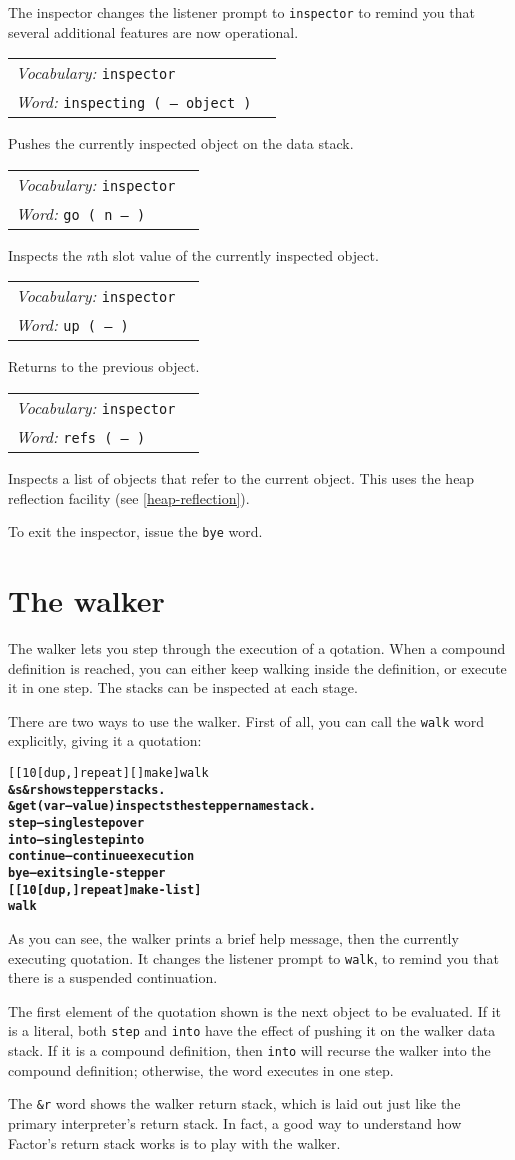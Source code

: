 \documentclass{book}
\newcommand{\vocabulary}[1]{\emph{Vocabulary:} \texttt{#1}&\\}
\newcommand{\ordinaryword}[2]{\index{\texttt{#1}}\emph{Word:} \texttt{#2}&\\}
\newcommand{\wordtable}[1]{


\begin{tabularx}{12cm}{lX}
\hline
#1
\hline
\end{tabularx}

}
\begin{document}
The inspector changes the listener prompt to \verb|inspector| to remind you that several additional features are now operational.
\wordtable{
\vocabulary{inspector}
\ordinaryword{inspecting}{inspecting ( -- object )}
}
Pushes the currently inspected object on the data stack.
\wordtable{
\vocabulary{inspector}
\ordinaryword{go}{go ( n -- )}
}
Inspects the $n$th slot value of the currently inspected object.
\wordtable{
\vocabulary{inspector}
\ordinaryword{up}{up ( -- )}
}
Returns to the previous object.
\wordtable{
\vocabulary{inspector}
\ordinaryword{refs}{refs ( -- )}
}
Inspects a list of objects that refer to the current object. This uses the heap reflection facility (see \ref{heap-reflection}).

To exit the inspector, issue the \verb|bye| word.

\section{The walker}

The walker lets you step through the execution of a qotation. When a compound definition is reached, you can either keep walking inside the definition, or execute it in one step. The stacks can be inspected at each stage.

There are two ways to use the walker. First of all, you can call the \texttt{walk} word explicitly, giving it a quotation:

\begin{alltt}
  [ [ 10 [ dup , ] repeat ] [ ] make ] walk
\textbf{\&s \&r show stepper stacks.
\&get ( var -- value ) inspects the stepper namestack.
step -- single step over
into -- single step into
continue -- continue execution
bye -- exit single-stepper
[ [ 10 [ dup , ] repeat ] make-list ]
walk}
\end{alltt}

As you can see, the walker prints a brief help message, then the currently executing quotation. It changes the listener prompt to \texttt{walk}, to remind you that there is a suspended continuation.

The first element of the quotation shown is the next object to be evaluated. If it is a literal, both \texttt{step} and \texttt{into} have the effect of pushing it on the walker data stack. If it is a compound definition, then \texttt{into} will recurse the walker into the compound definition; otherwise, the word executes in one step.

The \texttt{\&r} word shows the walker return stack, which is laid out just like the primary interpreter's return stack. In fact, a good way to understand how Factor's return stack works is to play with the walker.
\end{document}
